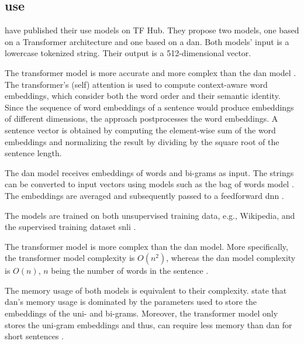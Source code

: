 \subsection{\ac{use}}\label{subsec:univ-sent-encoder}

\citeauthor{UniversalSentEnc2018} have published their \ac{use} models on TF Hub.
They propose two models, one based on a Transformer architecture and one based on a \ac{dan}.
Both models' input is a lowercase tokenized string.
Their output is a 512-dimensional vector.

The transformer model is more accurate and more complex than the \ac{dan} model \cite{UniversalSentEnc2018}.
The transformer's (self) attention is used to compute context-aware word embeddings, which consider both the word order and their semantic identity.
Since the sequence of word embeddings of a sentence would produce embeddings of different dimensions, the approach postprocesses the word embeddings.
A sentence vector is obtained by computing the element-wise sum of the word embeddings 
and normalizing the result by dividing by the square root of the sentence length.

The \ac{dan} model receives embeddings of words and bi-grams as input.
The strings can be converted to input vectors using models such as the bag of words model \cite{UniversalSentEnc-dan-input-emb}.
The embeddings are averaged and subsequently passed to a feedforward \ac{dnn} \cite{UniversalSentEnc2018}.

The models are trained on both unsupervised training data, e.g., Wikipedia, and the supervised training dataset \ac{snli} \cite{UniversalSentEnc2018, HfsentTrans2019}.

The transformer model is more complex than the \ac{dan} model.
More specifically, the transformer model complexity is $O(n^2)$, whereas the \ac{dan} model complexity is $O(n)$, 
$n$ being the number of words in the sentence \cite{UniversalSentEnc2018}.

The memory usage of both models is equivalent to their complexity.
\citeauthor{UniversalSentEnc2018} state that \ac{dan}'s memory usage is dominated by the parameters used to store the embeddings of the uni- and bi-grams.
Moreover, the transformer model only stores the uni-gram embeddings and thus, can require less memory than \ac{dan} for short sentences \cite{UniversalSentEnc2018}.